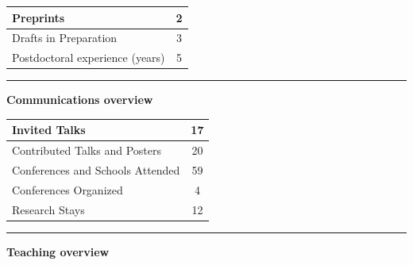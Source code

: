 \documentclass[a4paper]{article}
\newcommand{\block}[1]{\hrule \vspace{0.2cm} \textbf{\Large #1} \vspace{0.2cm}}
\begin{document}
\begin{minipage}[t]{0.375\columnwidth}
\begin{tabularx}{\linewidth}{|X|c|}
    Preprints & 2 \\
    \hline
    
    Drafts in Preparation & 3 \\
    \hline
    
    Postdoctoral experience (years) & 5 \\
    \hline
    
    \end{tabularx}
    \vspace{1em}





    \block{Communications overview} 
    
    \begin{tabularx}{\linewidth}{|X|c|}
    \hline
    
    Invited Talks & 17 \\
    \hline
    
    Contributed Talks and Posters & 20 \\
    \hline
    
    Conferences and Schools Attended & 59 \\
    \hline
    
    Conferences Organized & 4 \\
    \hline
    
    Research Stays & 12 \\
    \hline
    
    \end{tabularx}
    \vspace{1em}





    \block{Teaching overview} 
    
    \begin{tabularx}{\linewidth}{|X|c|}
    \hline
    

\end{tabularx}
\end{minipage}
\end{document}
